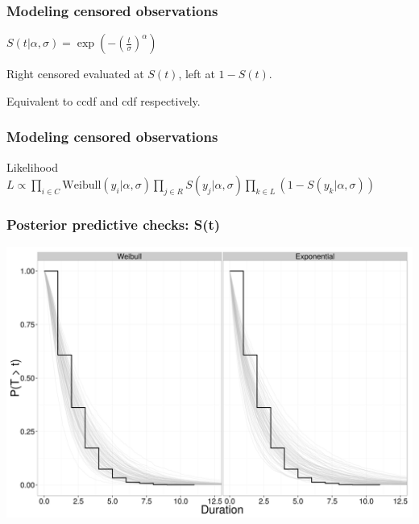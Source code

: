 \documentclass{beamer}
\begin{document}
\begin{frame}
  \frametitle{Modeling censored observations}
  \begin{definition}
    \(S(t | \alpha, \sigma) = \exp\left(-\left(\frac{t}{\sigma}\right)^{\alpha}\right)\)
  \end{definition}

  Right censored evaluated at \(S(t)\), left at \(1 - S(t)\). 
  
  Equivalent to ccdf and cdf respectively.
\end{frame}

\begin{frame}
  \frametitle{Modeling censored observations}
  \begin{block}{Likelihood}
    \(L \propto \prod_{i \in C} \mathrm{Weibull}(y_{i} | \alpha, \sigma) \prod_{j \in R} S(y_j | \alpha, \sigma) \prod_{k \in L} \left(1 - S(y_{k} | \alpha, \sigma)\right)\)
  \end{block}

\end{frame}

\begin{frame}
  \frametitle{Posterior predictive checks: S(t)}
  \begin{center}
    \includegraphics[height = 0.8\textheight, width = \textwidth,  keepaspectratio = true]{figure/survival_function}
  \end{center}
\end{frame}
\end{document}
